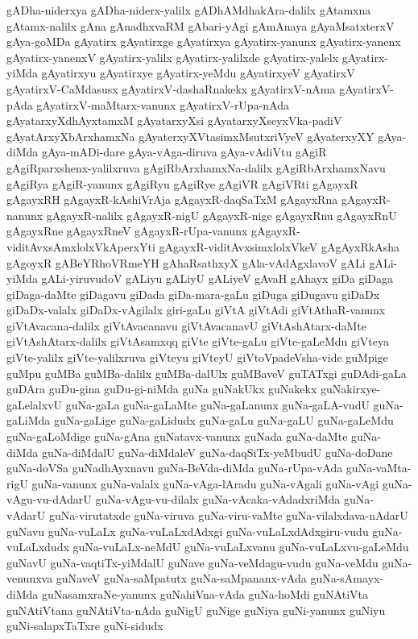 {gADha-niderxya
gADha-niderx-yalilx
gADhAMdhakAra-dalilx
gAtamxna
gAtamx-nalilx
gAna
gAnadhxvaRM
gAbari-yAgi
gAmAnaya
gAyaMsatxterxV
gAya-goMDa
gAyatirx
gAyatirxge
gAyatirxya
gAyatirx-yanunx
gAyatirx-yanenx
gAyatirx-yanenxV
gAyatirx-yalilx
gAyatirx-yalilxde
gAyatirx-yalelx
gAyatirx-yiMda
gAyatirxyu
gAyatirxye
gAyatirx-yeMdu
gAyatirxyeV
gAyatirxV
gAyatirxV-CaMdasusx
gAyatirxV-dashaRnakekx
gAyatirxV-nAma
gAyatirxV-pAda
gAyatirxV-maMtarx-vanunx
gAyatirxV-rUpa-nAda
gAyatarxyXdhAyxtamxM
gAyatarxyXsi
gAyatarxyXseyxVka-padiV
gAyatArxyXbArxhamxNa
gAyaterxyXVtasimxMsutxriVyeV
gAyaterxyXY
gAya-diMda
gAya-mADi-dare
gAya-vAga-diruva
gAya-vAdiVtu
gAgiR
gAgiRparxshenx-yalilxruva
gAgiRbArxhamxNa-dalilx
gAgiRbArxhamxNavu
gAgiRya
gAgiR-yanunx
gAgiRyu
gAgiRye
gAgiVR
gAgiVRti
gAgayxR
gAgayxRH
gAgayxR-kAshiVrAja
gAgayxR-daqSaTxM
gAgayxRna
gAgayxR-nanunx
gAgayxR-nalilx
gAgayxR-nigU
gAgayxR-nige
gAgayxRnu
gAgayxRnU
gAgayxRne
gAgayxRneV
gAgayxR-rUpa-vanunx
gAgayxR-viditAvxsAmxlolxVkAperxYti
gAgayxR-viditAvxsimxlolxVkeV
gAgAyxRkAsha
gAgoyxR
gABeYRhoVRmeYH
gAhaRsathxyX
gAla-vAdAgxlavoV
gALi
gALi-yiMda
gALi-yiruvudoV
gALiyu
gALiyU
gALiyeV
gAvaH
gAhayx
giDa
giDaga
giDaga-daMte
giDagavu
giDada
giDa-mara-gaLu
giDuga
giDugavu
giDaDx
giDaDx-valalx
giDaDx-vAgilalx
giri-gaLu
giVtA
giVtAdi
giVtAthaR-vanunx
giVtAvacana-dalilx
giVtAvacanavu
giVtAvacanavU
giVtAshAtarx-daMte
giVtAshAtarx-dalilx
giVtAsamxqq
giVte
giVte-gaLu
giVte-gaLeMdu
giVteya
giVte-yalilx
giVte-yalilxruva
giVteyu
giVteyU
giVtoVpadeVsha-vide
guMpige
guMpu
guMBa
guMBa-dalilx
guMBa-dalUlx
guMBaveV
guTATxgi
guDAdi-gaLa
guDAra
guDu-gina
guDu-gi-niMda
guNa
guNakUkx
guNakekx
guNakirxye-gaLelalxvU
guNa-gaLa
guNa-gaLaMte
guNa-gaLanunx
guNa-gaLA-vudU
guNa-gaLiMda
guNa-gaLige
guNa-gaLidudx
guNa-gaLu
guNa-gaLU
guNa-gaLeMdu
guNa-gaLoMdige
guNa-gAna
guNatavx-vanunx
guNada
guNa-daMte
guNa-diMda
guNa-diMdalU
guNa-diMdaleV
guNa-daqSiTx-yeMbudU
guNa-doDane
guNa-doVSa
guNadhAyxnavu
guNa-BeVda-diMda
guNa-rUpa-vAda
guNa-vaMta-rigU
guNa-vanunx
guNa-valalx
guNa-vAga-lAradu
guNa-vAgali
guNa-vAgi
guNa-vAgu-vu-dAdarU
guNa-vAgu-vu-dilalx
guNa-vAcaka-vAdadxriMda
guNa-vAdarU
guNa-virutatxde
guNa-viruva
guNa-viru-vaMte
guNa-vilalxdava-nAdarU
guNavu
guNa-vuLaLx
guNa-vuLaLxdAdxgi
guNa-vuLaLxdAdxgiru-vudu
guNa-vuLaLxdudx
guNa-vuLaLx-neMdU
guNa-vuLaLxvanu
guNa-vuLaLxvu-gaLeMdu
guNavU
guNa-vaqtiTx-yiMdalU
guNave
guNa-veMdagu-vudu
guNa-veMdu
guNa-venunxva
guNaveV
guNa-saMpatutx
guNa-saMpananx-vAda
guNa-sAmayx-diMda
guNasamxraNe-yanunx
guNahiVna-vAda
guNa-hoMdi
guNAtiVta
guNAtiVtana
guNAtiVta-nAda
guNigU
guNige
guNiya
guNi-yanunx
guNiyu
guNi-salapxTaTxre
guNi-sidudx
}
